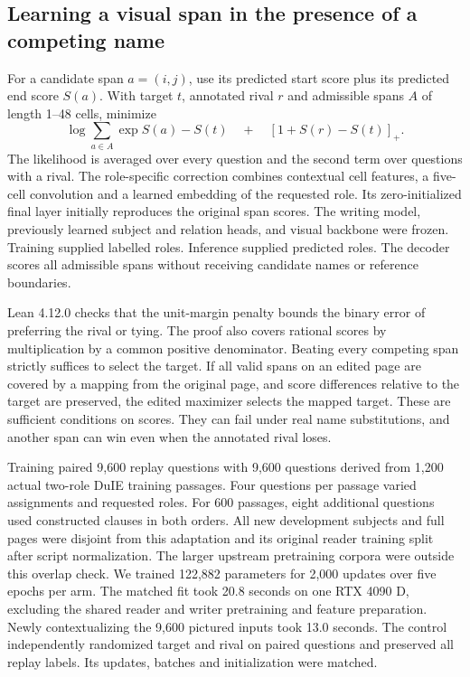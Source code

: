 \subsection*{Learning a visual span in the presence of a competing name}
For a candidate span $a=(i,j)$, use its predicted start score plus its predicted end score $S(a)$. With target $t$, annotated rival $r$ and admissible spans $A$ of length 1--48 cells, minimize
\[
\log\sum_{a\in A} \exp S(a)-S(t)
\quad +\quad [1+S(r)-S(t)]_+ .
\]
The likelihood is averaged over every question and the second term over questions with a rival. The role-specific correction combines contextual cell features, a five-cell convolution and a learned embedding of the requested role. Its zero-initialized final layer initially reproduces the original span scores. The writing model, previously learned subject and relation heads, and visual backbone were frozen. Training supplied labelled roles. Inference supplied predicted roles. The decoder scores all admissible spans without receiving candidate names or reference boundaries.

Lean 4.12.0 checks that the unit-margin penalty bounds the binary error of preferring the rival or tying. The proof also covers rational scores by multiplication by a common positive denominator. Beating every competing span strictly suffices to select the target. If all valid spans on an edited page are covered by a mapping from the original page, and score differences relative to the target are preserved, the edited maximizer selects the mapped target. These are sufficient conditions on scores. They can fail under real name substitutions, and another span can win even when the annotated rival loses.

Training paired 9,600 replay questions with 9,600 questions derived from 1,200 actual two-role DuIE training passages. Four questions per passage varied assignments and requested roles. For 600 passages, eight additional questions used constructed clauses in both orders. All new development subjects and full pages were disjoint from this adaptation and its original reader training split after script normalization. The larger upstream pretraining corpora were outside this overlap check. We trained 122,882 parameters for 2,000 updates over five epochs per arm. The matched fit took 20.8 seconds on one RTX 4090 D, excluding the shared reader and writer pretraining and feature preparation. Newly contextualizing the 9,600 pictured inputs took 13.0 seconds. The control independently randomized target and rival on paired questions and preserved all replay labels. Its updates, batches and initialization were matched.
